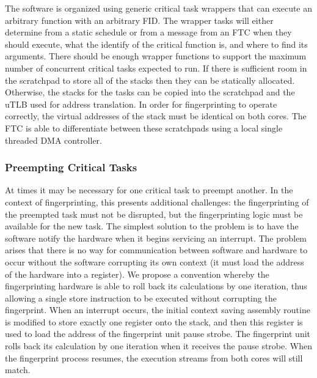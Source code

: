 	The software is organized using generic critical task wrappers that can execute an arbitrary function with an arbitrary FID.
	The wrapper tasks will either determine from a static schedule or from a message from an FTC when they should execute, what the identify of the critical function is, and where to find its arguments. 
	There should be enough wrapper functions to support the maximum number of concurrent critical tasks expected to run. 
	If there is sufficient room in the scratchpad to store all of the stacks then they can be statically allocated. 
	Otherwise, the stacks for the tasks can be copied into the scratchpad and the uTLB used for address translation. 
	In order for fingerprinting to operate correctly, the virtual addresses of the stack must be identical on both cores. 
	The FTC is able to differentiate between these scratchpads using a local single threaded DMA controller.




\subsubsection{Preempting Critical Tasks}
\label{s:hwsw:preemption}

	At times it may be necessary for one critical task to preempt another.
	In the context of fingerprinting, this presents additional challenges:
		the fingerprinting of the preempted task must not be disrupted, but the fingerprinting logic must be available for the new task.
	The simplest solution to the problem is to have the software notify the hardware when it begins servicing an interrupt. 
	The problem arises that there is no way for communication between software and hardware to occur without the software corrupting its own context (it must load the address of the hardware into a register). 
	We propose a convention whereby the fingerprinting hardware is able to roll back its calculations by one iteration, thus allowing a single store instruction to be executed without corrupting the fingerprint. 
	When an interrupt occurs, the initial context saving assembly routine is modified to store exactly one register onto the stack, and then this register is used to load the address of the fingerprint unit pause strobe. 
	The fingerprint unit rolls back its calculation by one iteration when it receives the pause strobe. 
	When the fingerprint process resumes, the execution streams from both cores will still match.
	
